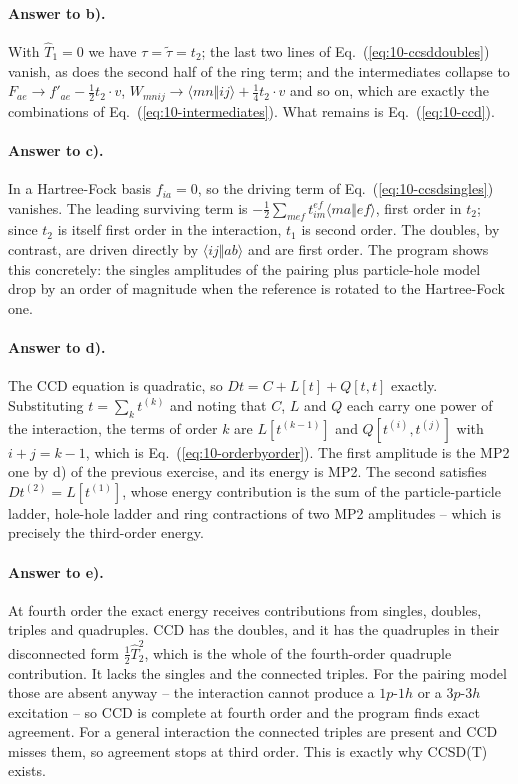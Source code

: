\paragraph{Answer to b).}
With $\hat{T}_1=0$ we have $\tau=\tilde\tau=t_2$; the last two lines of
Eq.~(\ref{eq:10-ccsddoubles}) vanish, as does the second half of the ring
term; and the intermediates collapse to
$F_{ae}\to f'_{ae}-\tfrac12 t_2\!\cdot\!v$,
$W_{mnij}\to\langle mn\Vert ij\rangle+\tfrac14 t_2\!\cdot\!v$ and so on,
which are exactly the combinations of
Eq.~(\ref{eq:10-intermediates}).  What remains is Eq.~(\ref{eq:10-ccd}).

\paragraph{Answer to c).}
In a Hartree-Fock basis $f_{ia}=0$, so the driving term of
Eq.~(\ref{eq:10-ccsdsingles}) vanishes.  The leading surviving term is
$-\tfrac12\sum_{mef}t_{im}^{ef}\langle ma\Vert ef\rangle$, first order in
$t_2$; since $t_2$ is itself first order in the interaction, $t_1$ is second
order.  The doubles, by contrast, are driven directly by
$\langle ij\Vert ab\rangle$ and are first order.  The program shows this
concretely: the singles amplitudes of the pairing plus particle-hole model
drop by an order of magnitude when the reference is rotated to the
Hartree-Fock one.

\paragraph{Answer to d).}
The CCD equation is quadratic, so $D t=C+L[t]+Q[t,t]$ exactly.  Substituting
$t=\sum_k t^{(k)}$ and noting that $C$, $L$ and $Q$ each carry one power of
the interaction, the terms of order $k$ are
$L[t^{(k-1)}]$ and $Q[t^{(i)},t^{(j)}]$ with $i+j=k-1$, which is
Eq.~(\ref{eq:10-orderbyorder}).  The first amplitude is the MP2 one by d) of
the previous exercise, and its energy is MP2.  The second satisfies
$Dt^{(2)}=L[t^{(1)}]$, whose energy contribution is the sum of the
particle-particle ladder, hole-hole ladder and ring contractions of two MP2
amplitudes -- which is precisely the third-order energy.

\paragraph{Answer to e).}
At fourth order the exact energy receives contributions from singles,
doubles, triples and quadruples.  CCD has the doubles, and it has the
quadruples in their disconnected form $\tfrac12\hat{T}_2^2$, which is the
whole of the fourth-order quadruple contribution.  It lacks the singles and
the connected triples.  For the pairing model those are absent anyway -- the
interaction cannot produce a $1p$-$1h$ or a $3p$-$3h$ excitation -- so CCD is
complete at fourth order and the program finds exact agreement.  For a
general interaction the connected triples are present and CCD misses them, so
agreement stops at third order.  This is exactly why CCSD(T) exists.

